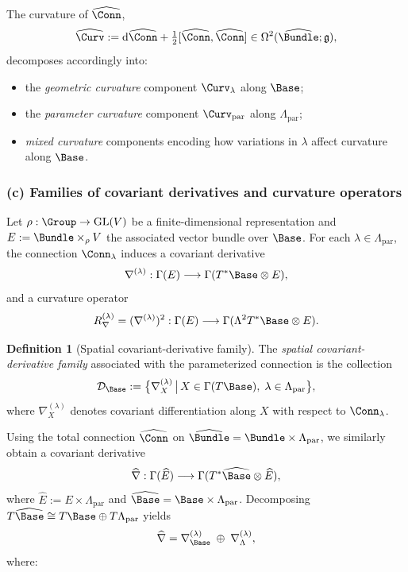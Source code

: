 \documentclass[11pt]{book}
\theoremstyle{plain}
\theoremstyle{definition}
\newtheorem{definition}[theorem]{Definition} \theoremstyle{remark}
\begin{document}
The curvature of $\widehat{\Conn}$,
\[
   \widehat{\Curv}
   :=
   \mathrm{d}\widehat{\Conn}
   + \tfrac12[\widehat{\Conn},\widehat{\Conn}]
   \in\Omega^2(\widehat{\Bundle};\mathfrak{g}),
\]
decomposes accordingly into:

\begin{itemize}
  \item the \emph{geometric curvature} component
        $\Curv_\lambda$ along $\Base$;
  \item the \emph{parameter curvature} component
        $\Curv_{\mathrm{par}}$ along $\Lambda_{\mathrm{par}}$;
  \item \emph{mixed curvature} components encoding how variations in
        $\lambda$ affect curvature along $\Base$.
\end{itemize}



\subsubsection*{(c) Families of covariant derivatives and curvature operators}

Let $\rho:\Group\to\mathrm{GL}(V)$ be a finite-dimensional
representation and $E:=\Bundle\times_\rho V$ the associated vector
bundle over $\Base$. For each $\lambda\in\Lambda_{\mathrm{par}}$, the
connection $\Conn_\lambda$ induces a covariant derivative
\[
   \nabla^{(\lambda)}:
      \Gamma(E)\longrightarrow
      \Gamma(T^*\Base\otimes E),
\]
and a curvature operator
\[
   R^{(\lambda)}_\nabla
   =
   (\nabla^{(\lambda)})^2
   :
   \Gamma(E)
   \longrightarrow
   \Gamma(\Lambda^2T^*\Base\otimes E).
\]

\begin{definition}[Spatial covariant-derivative family]
The \emph{spatial covariant-derivative family} associated with the
  parameterized connection is the collection
  \[
     \mathcal{D}_{\Base}
     :=
     \bigl\{
       \nabla^{(\lambda)}_X
       \,\big|\,
       X\in\Gamma(T\Base),\;
       \lambda\in\Lambda_{\mathrm{par}}
     \bigr\},
  \]
  where $\nabla^{(\lambda)}_X$ denotes covariant differentiation along
  $X$ with respect to $\Conn_\lambda$.
\end{definition}

Using the total connection $\widehat{\Conn}$ on
$\widehat{\Bundle}=\Bundle\times\Lambda_{\mathrm{par}}$, we similarly
obtain a covariant derivative
\[
   \widehat{\nabla}:
     \Gamma(\widehat{E})
     \longrightarrow
     \Gamma(T^*\widehat{\Base}\otimes\widehat{E}),
\]
where $\widehat{E}:=E\times\Lambda_{\mathrm{par}}$ and
$\widehat{\Base}=\Base\times\Lambda_{\mathrm{par}}$. Decomposing
$T\widehat{\Base}\cong T\Base\oplus T\Lambda_{\mathrm{par}}$ yields
\[
   \widehat{\nabla}
   =
   \nabla^{(\lambda)}_{\Base}
   \;\oplus\;
   \nabla^{(\lambda)}_{\Lambda},
\]
where:
\end{document}
